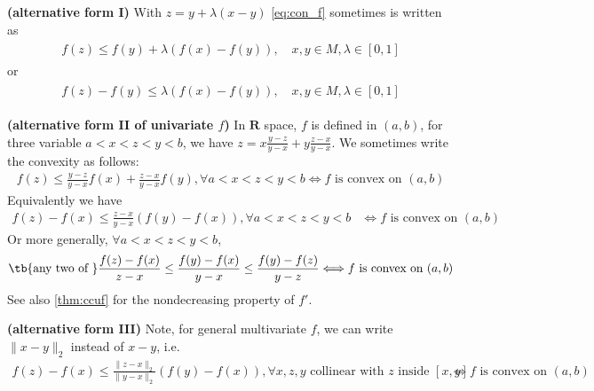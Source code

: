\documentclass{article}
\newcommand{\bfs}[1]{\textbf{({#1}) }}
\begin{document}
\begin{rema}{\bfs{alternative form I}}\label{rem:albc} With $z=y+\lambda(x- y)$
\cref{eq:con_f} sometimes is written as 
\begin{align}\begin{aligned}
      f(z) \le  f(y)+\lambda \left(f(x)-f(y)\right), \quad x, y \in M, \lambda \in[0,1]\label{eq:con_ff}
      \end{aligned}
\end{align}
or
\begin{align}\begin{aligned}
      f(z)-  f(y)\le \lambda \left(f(x)-f(y)\right), \quad x, y \in M, \lambda \in[0,1]\label{eq:con_ff1}
      \end{aligned}
\end{align}

\end{rema}
\begin{rema}{\bfs{alternative form II of univariate $f$}}\label{rem:alc}
In $\mathbf{R}$ space,  $f$ is defined in $(a,b)$, for  three variable $a<x<z<y<b$, we have $z=x\frac{y-z}{y-x}+y\frac{z-x}{y-x}$. We sometimes write the convexity as follows:
\begin{align*}
    f(z)\le \frac{y-z}{y-x}f(x)+\frac{z-x}{y-x}f(y),\forall a<x<z<y<b\Longleftrightarrow f\text{ is convex on } (a,b)
\end{align*}
Equivalently we have 
\begin{align}
 f(z)-f(x)\le \frac{z-x}{y-x}(f(y)-f(x)) ,\forall a<x<z<y<b&\Longleftrightarrow f\text{ is convex on } (a,b)\label{eq:real_conx}
 \end{align}
 Or more generally, $\forall a<x<z<y<b$,
 \begin{align}
    \text{\tb{any two of }}  \frac{f(z)-f(x)}{z-x}\le \frac{f(y)-f(x)}{y-x}\le \frac{f(y)-f(z)}{y-z} \Longleftrightarrow f\text{ is convex on } (a,b)\label{eq:real_conx2}
\end{align}
See also \cref{thm:ccuf} for the nondecreasing property of $f'$.
\end{rema}
\begin{rema}{\bfs{alternative form III}}\label{rem:alccc}
Note, for general multivariate $f$, we can write $\|x-y\|_2$ instead of $x-y$, i.e.
\begin{align}
 f(z)-f(x)\le \frac{\|z-x\|_2}{\|y-x\|_2}(f(y)-f(x)) ,\forall x,z,y \text{ collinear with $z$ inside $[x,y]$}  &\Longleftrightarrow f\text{ is convex on } (a,b)\label{eq:real_conx3}
 \end{align}

\end{rema}
\end{document}
